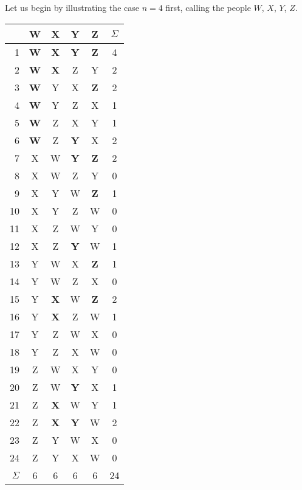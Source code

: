 \documentclass[11pt]{scrartcl}
\begin{document}
Let us begin by illustrating the case $n=4$ first, calling the people $W$, $X$, $Y$, $Z$.
\begin{center}
\begin{tabular}[h]{r|cccc|c}
  & W & X & Y & Z & $\Sigma$ \\ \hline\hline

1 & \textbf{\color{red} W} & \textbf{\color{red} X} & \textbf{\color{red} Y} & \textbf{\color{red} Z} & 4 \\
2 & \textbf{\color{red} W} & \textbf{\color{red} X} & Z & Y & 2 \\
3 & \textbf{\color{red} W} & Y & X & \textbf{\color{red} Z} & 2 \\
4 & \textbf{\color{red} W} & Y & Z & X & 1 \\
5 & \textbf{\color{red} W} & Z & X & Y & 1 \\
6 & \textbf{\color{red} W} & Z & \textbf{\color{red} Y} & X & 2 \\
7 & X & W & \textbf{\color{red} Y} & \textbf{\color{red} Z} & 2 \\
8 & X & W & Z & Y & 0 \\
9 & X & Y & W & \textbf{\color{red} Z} & 1 \\
10 & X & Y & Z & W & 0 \\
11 & X & Z & W & Y & 0 \\
12 & X & Z & \textbf{\color{red} Y} & W & 1 \\
13 & Y & W & X & \textbf{\color{red} Z} & 1 \\
14 & Y & W & Z & X & 0 \\
15 & Y & \textbf{\color{red} X} & W & \textbf{\color{red} Z} & 2 \\
16 & Y & \textbf{\color{red} X} & Z & W & 1 \\
17 & Y & Z & W & X & 0 \\
18 & Y & Z & X & W & 0 \\
19 & Z & W & X & Y & 0 \\
20 & Z & W & \textbf{\color{red} Y} & X & 1 \\
21 & Z & \textbf{\color{red} X} & W & Y & 1 \\
22 & Z & \textbf{\color{red} X} & \textbf{\color{red} Y} & W & 2 \\
23 & Z & Y & W & X & 0 \\
24 & Z & Y & X & W & 0 \\

\hline
$\Sigma$ & 6 & 6 & 6 & 6 & 24
\end{tabular}
\end{center}
\end{document}

